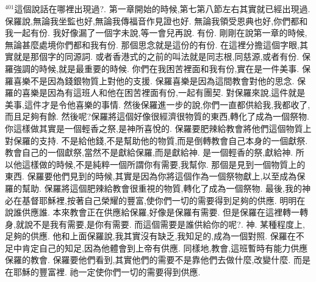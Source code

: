 \documentclass{book}
\begin{document}
$^{401}$這個說話在哪裡出現過?.
第一章開始的時候,第七第八節左右其實就已經出現過.
保羅說,無論我坐監也好,無論我傳福音作見證也好.
無論我領受恩典也好,你們都和我一起有份.
我好像漏了一個字未說,等一會兒再說.
有份.
剛剛在說第一章的時候,無論甚麼處境你們都和我有份.
那個思念就是這份的有份.
在這裡分擔這個字眼,其實就是那個字的同源詞.
或者香港式的之前的叫法就是同志根,同慈源,或者有份.
保羅強調的時候,就是最重要的時候.
你們在我困苦裡面和我有份,實在是一件美事.
保羅喜樂不是因為錢銀物質上對他的支援.
保羅喜樂是因為這間教會對他的思念.
保羅的喜樂是因為有這班人和他在困苦裡面有份,一起有團契.
對保羅來說,這件就是美事,這件才是令他喜樂的事情.
然後保羅進一步的說,你們一直都供給我,我都收了,而且足夠有餘.
然後呢?保羅將這個好像很經濟很物質的東西,轉化了成為一個祭物.
你這樣做其實是一個輕香之祭,是神所喜悅的.
保羅要肥辣給教會將他們這個物質上對保羅的支持.
不是給他錢,不是幫助他的物質,而是倒轉教會自己本身的一個獻祭.
教會自己的一個獻祭,當然不是獻給保羅,而是獻給神.
是一個輕香的祭,獻給神.
所以他這樣做的時候,不是純粹一個所謂你有需要,我幫你.
那個是見到一個物質上的東西.
保羅要他們見到的時候,其實是因為你將這個作為一個祭物獻上,以至成為保羅的幫助.
保羅將這個肥辣給教會很重視的物質,轉化了成為一個祭物.
最後,我的神必在基督耶穌裡,按著自己榮耀的豐富,使你們一切的需要得到足夠的供應.
明明在說誰供應誰.
本來教會正在供應給保羅,好像是保羅有需要.
但是保羅在這裡轉一轉身,就說不是我有需要,是你有需要.
而這個需要是誰供給你的呢?.
神.
某種程度上,足夠的供應.
他和上面保羅說,我其實沒有缺乏,我知足的,成為一個對照.
保羅在不足中肯定自己的知足,因為他體會到上帝有供應.
同樣地,教會,這班暫時有能力供應保羅的教會.
保羅要他們看到,其實他們的需要不是靠他們去做什麼,改變什麼.
而是在耶穌的豐富裡.
祂一定使你們一切的需要得到供應.
\end{document}
